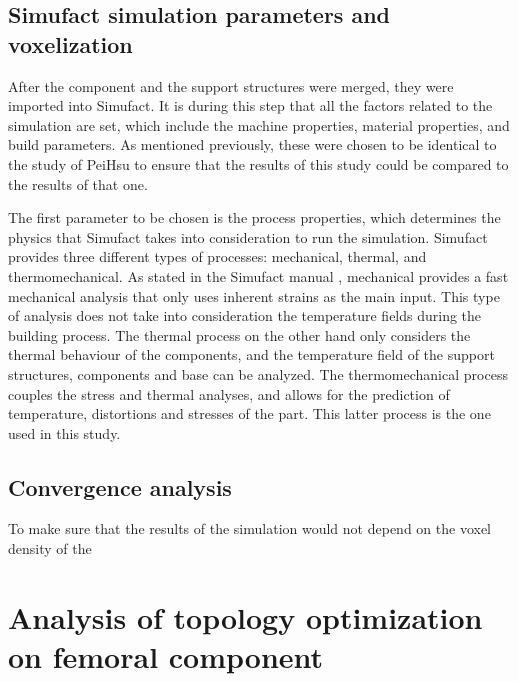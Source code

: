\documentclass{article}
\begin{document}

\subsection{Simufact simulation parameters and voxelization}


After the component and the support structures were merged, they were imported into Simufact. It is during this step that all the factors related to the simulation are set, which include the machine properties, material properties, and build parameters. As mentioned previously, these were chosen to be identical to the study of PeiHsu to ensure that the results of this study could be compared to the results of that one. 

The first parameter to be chosen is the process properties, which determines the physics that Simufact takes into consideration to run the simulation. Simufact provides three different types of processes: mechanical, thermal, and thermomechanical. As stated in the Simufact manual , mechanical provides a fast mechanical analysis that only uses inherent strains as the main input. This type of analysis does not take into consideration the temperature fields during the building process. The thermal process on the other hand only considers the thermal behaviour of the components, and the temperature field of the support structures, components and base can be analyzed. The thermomechanical process couples the stress and thermal analyses, and allows for the prediction of temperature, distortions and stresses of the part. This latter process is the one used in this study.

\subsection{Convergence analysis}

To make sure that the results of the simulation would not depend on the voxel density of the 



\section{Analysis of topology optimization on femoral component}

\listoftodos
\end{document}
